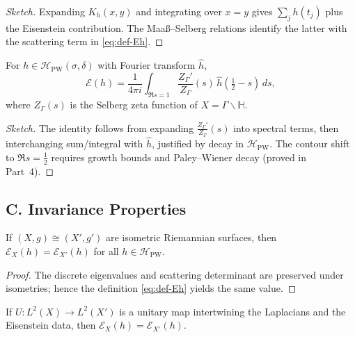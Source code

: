 \begin{proof}[Sketch]
Expanding $K_h(x,y)$ and integrating over $x=y$ gives $\sum_j h(t_j)$ plus the Eisenstein contribution. The Maaß–Selberg relations identify the latter with the scattering term in \eqref{eq:def-Eh}.
\end{proof}

\begin{theorem}
\label{thm:equiv-zeta}
For $h\in \mathcal H_{\mathrm{PW}}(\sigma,\delta)$ with Fourier transform $\widehat h$,
\[
  \mathcal E(h) = \frac{1}{4\pi i}\int_{\Re s=1} \frac{Z_\Gamma'}{Z_\Gamma}(s)\,
  \widehat h\!\left(\tfrac12-s\right)\,ds,
\]
where $Z_\Gamma(s)$ is the Selberg zeta function of $X=\Gamma\backslash\mathbb H$.
\end{theorem}

\begin{proof}[Sketch]
The identity follows from expanding $\tfrac{Z_\Gamma'}{Z_\Gamma}(s)$ into spectral terms, then interchanging sum/integral with $\widehat h$, justified by decay in $\mathcal H_{\mathrm{PW}}$. The contour shift to $\Re s=\tfrac12$ requires growth bounds and Paley–Wiener decay (proved in Part~4).
\end{proof}

\subsection*{C. Invariance Properties}
\label{subsec:invariance}

\begin{proposition}
\label{prop:isometric-invariance}
If $(X,g)\cong (X',g')$ are isometric Riemannian surfaces, then $\mathcal E_X(h)=\mathcal E_{X'}(h)$ for all $h\in \mathcal H_{\mathrm{PW}}$.
\end{proposition}

\begin{proof}
The discrete eigenvalues and scattering determinant are preserved under isometries; hence the definition \eqref{eq:def-Eh} yields the same value.
\end{proof}

\begin{proposition}
\label{prop:unitary-invariance}
If $U:L^2(X)\to L^2(X')$ is a unitary map intertwining the Laplacians and the Eisenstein data, then $\mathcal E_X(h)=\mathcal E_{X'}(h)$.
\end{proposition}

